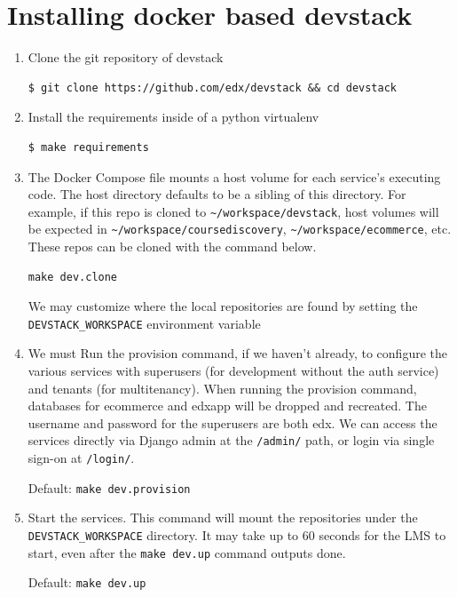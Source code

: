 \section{Installing docker based devstack}
\begin{enumerate}
	\item Clone the git repository of devstack\newline
	\begin{center}
	\begin{verbatim}$ git clone https://github.com/edx/devstack && cd devstack
	\end{verbatim}
	\end{center}
	\item Install the requirements inside of a python virtualenv \newline
	\begin{center}
	\begin{verbatim}$ make requirements
	\end{verbatim}
	\end{center}
	\item The Docker Compose file mounts a host volume for each service's executing code. The
host directory defaults to be a sibling of this directory. For example, if this repo is
cloned to \verb=~/workspace/devstack=, host volumes will be expected in \verb=~/workspace/coursediscovery=,
\verb=~/workspace/ecommerce=, etc. These repos can be cloned with the command
below.\newline
\begin{center}
\begin{verbatim}make dev.clone
\end{verbatim}
\end{center}
We may customize where the local repositories are found by setting the
\verb=DEVSTACK_WORKSPACE= environment variable
	\item We must Run the provision command, if we haven't already, to configure the various
services with superusers (for development without the auth service) and tenants (for multitenancy).
When running the provision command, databases for ecommerce and edxapp will
be dropped and recreated.
The username and password for the superusers are both edx. We can access the services
directly via Django admin at the \verb=/admin/= path, or login via single sign-on at \verb=/login/=.\newline
\begin{center}
Default: \verb=make dev.provision=
\end{center}
	\item Start the services. This command will mount the repositories under the
\verb=DEVSTACK_WORKSPACE= directory. It may take up to 60 seconds for the LMS to start,
even after the \verb=make dev.up= command outputs done.\newline
\begin{center}
Default: \verb=make dev.up=
\end{center}
\end{enumerate}

